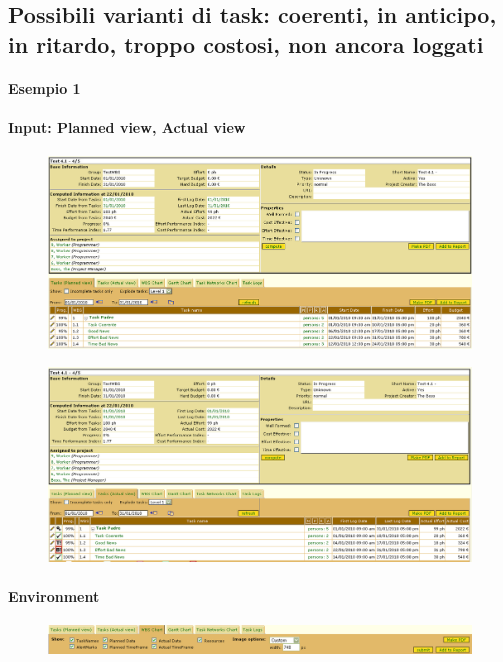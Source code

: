 \subsection{Possibili varianti di task: coerenti, in anticipo, in ritardo, troppo costosi, non ancora loggati}

\paragraph{Esempio 1}
\paragraph{Input: Planned view, Actual view}
\begin{figure}
\centering
\includegraphics[width=\textwidth]{tests/TEST_WBS/4.1/4.1_4_5/Esempio_1/input.png}
\end{figure}
\begin{figure}
\centering
\includegraphics[width=\textwidth]{tests/TEST_WBS/4.1/4.1_4_5/Esempio_1/input_actual.png}
\end{figure}
\newpage

\paragraph{Environment}
\begin{figure}
\centering
\includegraphics[width=\textwidth]{tests/TEST_WBS/4.1/4.1_4_5/Esempio_1/environment.png}
\end{figure}

